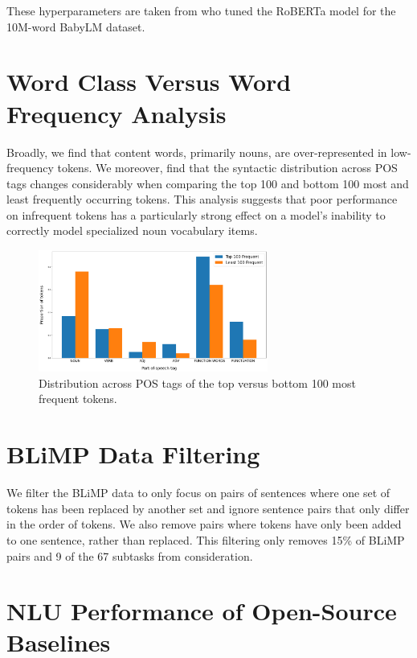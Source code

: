 These hyperparameters are taken from \citet{diehlmartinez2023climb} who tuned the RoBERTa model for the 10M-word BabyLM dataset. 

\section{Word Class Versus Word Frequency Analysis}
\label{section:word-class-versus-word-frequency}

Broadly, we find that content words, primarily nouns, are over-represented in low-frequency tokens. We moreover, find that the syntactic distribution across POS tags changes considerably when comparing the top 100 and bottom 100 most and least frequently occurring tokens. This analysis suggests that poor performance on infrequent tokens has a particularly strong effect on a model's inability to correctly model specialized noun vocabulary items. 

\begin{figure}[ht!]
    \centering
    \includegraphics[height=4cm]{chapters/syntatic-smoothing/figures/top_versus_bottom_pos_dist.png}
    \caption{Distribution across POS tags of the top versus bottom 100 most frequent tokens.}
    \label{fig:top-100-pos-dist}
\end{figure}

\section{BLiMP Data Filtering}
\label{section:appendix-data-filtering}

We filter the BLiMP data to only focus on pairs of sentences where one set of tokens has been replaced by another set and ignore sentence pairs that only differ in the order of tokens. We also remove pairs where tokens have only been added to one sentence, rather than replaced. This filtering only removes 15\% of BLiMP pairs and 9 of the 67 subtasks from consideration. 

\section{NLU Performance of Open-Source Baselines}
\label{section:opensource-baselines-nlu-results}

